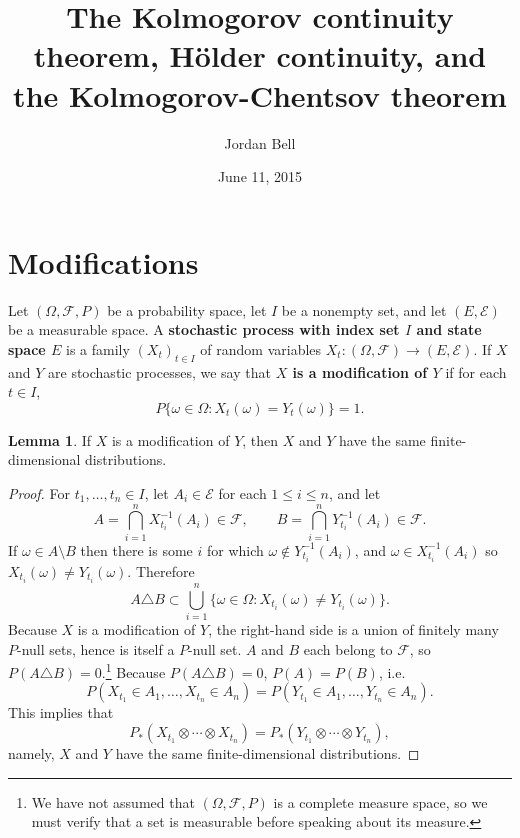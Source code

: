 \documentclass{article}
\theoremstyle{definition}
\newtheorem{lemma}[theorem]{Lemma}
\theoremstyle{definition}
\begin{document}
\title{The Kolmogorov continuity theorem, H\"older continuity, and the Kolmogorov-Chentsov theorem}
\author{Jordan Bell}
\date{June 11, 2015}

\maketitle

\section{Modifications}
Let $(\Omega,\mathscr{F},P)$ be a probability space, let $I$ be a nonempty set, and let
$(E,\mathscr{E})$ be a measurable space. A \textbf{stochastic process with index set $I$ and state space $E$} is a family 
$(X_t)_{t \in I}$ of random variables $X_t:(\Omega,\mathscr{F}) \to (E,\mathscr{E})$.
If $X$ and $Y$ are stochastic processes, we say that \textbf{$X$ is a modification of $Y$} if 
for each $t \in I$, 
\[
P\{\omega \in \Omega: X_t(\omega)=Y_t(\omega)\}=1.
\]

\begin{lemma}
If $X$ is a modification of $Y$, then $X$ and $Y$ have the same finite-dimensional distributions.
\end{lemma}
\begin{proof}
For $t_1,\ldots,t_n \in  I$, let $A_i \in \mathscr{E}$ for each $1 \leq i \leq n$, and let
\[
A = \bigcap_{i=1}^n X_{t_i}^{-1}(A_i) \in \mathscr{F}, \qquad B = \bigcap_{i=1}^n Y_{t_i}^{-1}(A_i) \in \mathscr{F}.
\]
If $\omega \in A \setminus B$ then there is some $i$ for which $\omega \not \in Y_{t_i}^{-1}(A_i)$, and
$\omega \in X_{t_i}^{-1}(A_i)$ so $X_{t_i}(\omega) \neq Y_{t_i}(\omega)$. Therefore
\[
A \triangle B \subset \bigcup_{i=1}^n \{\omega \in \Omega: X_{t_i}(\omega) \neq Y_{t_i}(\omega)\}.
\]
Because $X$ is a modification of $Y$, the right-hand side is a union of finitely many $P$-null sets,
hence is itself a $P$-null set.  $A$ and $B$ each belong to $\mathscr{F}$, so
$P(A \triangle B)=0$.\footnote{We have not assumed that $(\Omega,\mathscr{F},P)$ is a complete measure space, so we must verify
that a set is measurable before speaking about its measure.}
Because $P(A \triangle B)=0$, $P(A)=P(B)$, i.e.
\[
P(X_{t_1} \in A_1, \ldots, X_{t_n} \in A_n) = P(Y_{t_1} \in A_1, \ldots, Y_{t_n} \in A_n).
\]
This implies that
\[
P_*(X_{t_1} \otimes \cdots \otimes X_{t_n}) = P_*(Y_{t_1} \otimes \cdots \otimes Y_{t_n}),
\]
namely,  $X$ and $Y$ have the same finite-dimensional distributions.
\end{proof}
\end{document}
